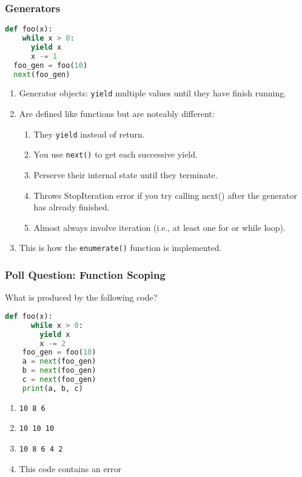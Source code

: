 \documentclass{beamer}
\begin{document}
%
%
\begin{frame}[fragile]
  \frametitle{Generators}
  \begin{lstlisting}[language=Python, autogobble]
  def foo(x):
    while x > 0:
      yield x
      x -= 1
  foo_gen = foo(10)
  next(foo_gen)
  \end{lstlisting}
  \vfill
  \begin{enumerate}[A]
    \item Generator objects: \lstinline|yield| multiple values until they have finish running.
      \pause
    \item Are defined like functions but are noteably different:
      \begin{enumerate}
        \item They \lstinline|yield| instead of return.
        \item You use \lstinline|next()| to get each successive yield.
        \item Perserve their internal state until they terminate.
        \item Throws StopIteration error if you try calling next() after the generator has already finished.
        \item Almost always involve iteration (i.e., at least one for or while loop).
      \end{enumerate}
      \pause
    \item This is how the \lstinline|enumerate()| function is implemented.
  \end{enumerate}
\end{frame}



%
%
\begin{frame}[fragile]
  \frametitle{Poll Question: Function Scoping}
  \begin{minipage}{0.69\textwidth}
    What is produced by the following code?
    \begin{lstlisting}[language=Python, autogobble]
    def foo(x):
      while x > 0:
        yield x
        x -= 2
    foo_gen = foo(10)
    a = next(foo_gen)
    b = next(foo_gen)
    c = next(foo_gen)
    print(a, b, c)
    \end{lstlisting}
  \end{minipage}
  \hfill
  \begin{minipage}{0.29\textwidth}
    \begin{enumerate}[A]
      \item \lstinline|10 8 6|
      \item \lstinline|10 10 10|
      \item \lstinline|10 8 6 4 2|
      \item This code contains an error
    \end{enumerate}
  \end{minipage}
\end{frame}
\end{document}
